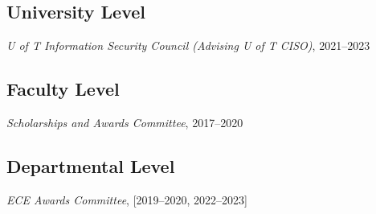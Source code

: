 \subsection{University Level}
\begin{innerenum}
	\item \textit{U of T Information Security Council (Advising U of T CISO)}, {2021--2023}	
\end{innerenum}

\subsection{Faculty Level}
\begin{innerenum}
	\item \textit{Scholarships and Awards Committee}, 2017--2020	
\end{innerenum}

\subsection{Departmental Level}
\begin{innerenum}
	\item \textit{ECE Awards Committee}, [2019--2020, 2022--2023]	
\end{innerenum}
